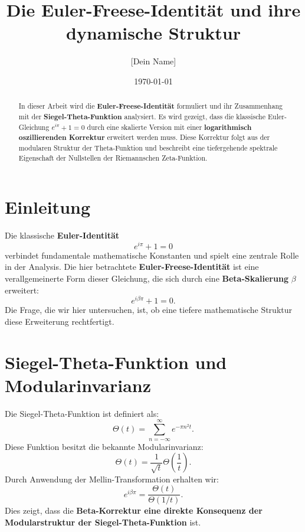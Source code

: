 \documentclass[a4paper,12pt]{article}
\title{Die Euler-Freese-Identität und ihre dynamische Struktur}
\author{[Dein Name]}
\date{\today}
\begin{document}
\maketitle

\begin{abstract}
In dieser Arbeit wird die \textbf{Euler-Freese-Identität} formuliert und ihr Zusammenhang mit der \textbf{Siegel-Theta-Funktion} analysiert. Es wird gezeigt, dass die klassische Euler-Gleichung \( e^{i\pi} + 1 = 0 \) durch eine skalierte Version mit einer \textbf{logarithmisch oszillierenden Korrektur} erweitert werden muss. Diese Korrektur folgt aus der modularen Struktur der Theta-Funktion und beschreibt eine tiefergehende spektrale Eigenschaft der Nullstellen der Riemannschen Zeta-Funktion.
\end{abstract}

\section{Einleitung}
Die klassische \textbf{Euler-Identität}
\begin{equation}
    e^{i\pi} + 1 = 0
\end{equation}
verbindet fundamentale mathematische Konstanten und spielt eine zentrale Rolle in der Analysis. Die hier betrachtete \textbf{Euler-Freese-Identität} ist eine verallgemeinerte Form dieser Gleichung, die sich durch eine \textbf{Beta-Skalierung} \( \beta \) erweitert:
\begin{equation}
    e^{i\beta \pi} + 1 = 0.
\end{equation}
Die Frage, die wir hier untersuchen, ist, ob eine tiefere mathematische Struktur diese Erweiterung rechtfertigt.

\section{Siegel-Theta-Funktion und Modularinvarianz}
Die Siegel-Theta-Funktion ist definiert als:
\begin{equation}
    \Theta(t) = \sum_{n=-\infty}^{\infty} e^{-\pi n^2 t}.
\end{equation}
Diese Funktion besitzt die bekannte Modularinvarianz:
\begin{equation}
    \Theta(t) = \frac{1}{\sqrt{t}} \Theta\left(\frac{1}{t}\right).
\end{equation}
Durch Anwendung der Mellin-Transformation erhalten wir:
\begin{equation}
    e^{i\beta\pi} = \frac{\Theta(t)}{\Theta(1/t)}.
\end{equation}
Dies zeigt, dass die \textbf{Beta-Korrektur eine direkte Konsequenz der Modularstruktur der Siegel-Theta-Funktion} ist.
\end{document}
